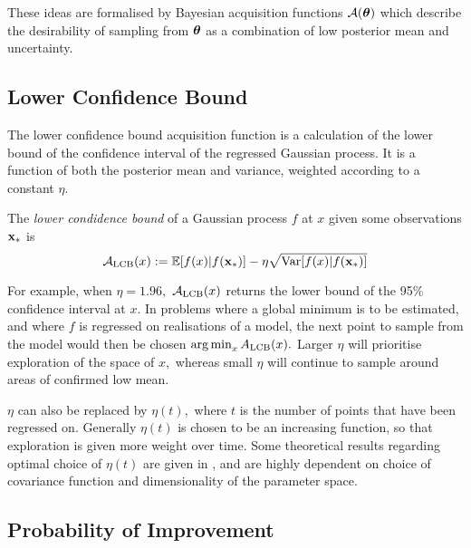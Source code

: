 These ideas are
formalised by Bayesian acquisition functions $\mathcal{A}(\bm{\theta})$ which
describe the desirability of sampling from $\bm{\theta}$ as a combination of low
posterior mean and uncertainty.

\subsection*{Lower Confidence Bound}

The lower confidence bound acquisition function is a calculation of the lower
bound of the confidence interval of the regressed Gaussian process. It is a
function of both the posterior mean and variance, weighted according to a
constant $\eta.$

\begin{definition}
    The \emph{lower condidence bound} of a Gaussian process $f$ at $x$ given
    some observations $\mathbf{x}_*$ is
    $$
        \mathcal{A}_\mathrm{LCB}(x)
        := \operatorname{\mathbb{E}}[f(x) | f(\mathbf{x}_*)]
        - \eta \sqrt{\mathrm{Var}[f(x) | f(\mathbf{x}_*)]}
    $$
\end{definition}

\begin{figure}
\end{figure}

For example, when $\eta = 1.96,$ $\mathcal{A}_\text{LCB}(x)$ returns the lower
bound of the 95\% confidence interval at $x.$ In problems where a global
minimum is to be estimated, and where $f$ is regressed on realisations of
a model, the next point to sample from the
model would then be chosen $\operatorname*{arg\,min}_{x} A_\mathrm{LCB}(x).$
Larger $\eta$ will prioritise
exploration of the space of $x,$ whereas small $\eta$ will continue to sample
around areas of confirmed low mean.

$\eta$ can also be replaced by
$\eta(t),$ where $t$ is the number of points that have been regressed on.
Generally $\eta(t)$ is chosen to be an increasing function, so that exploration
is given more weight over time. Some theoretical results regarding optimal
choice of
$\eta(t)$ are given in \cite{srinivas_gaussian_2010}, and are highly dependent
on choice of covariance function and dimensionality of the parameter space.

\subsection*{Probability of Improvement}

